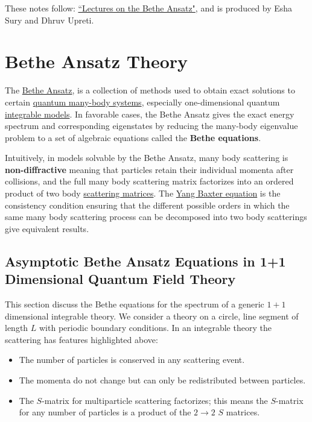 \documentclass{article}
\begin{document}
These notes follow: \href{https://arxiv.org/pdf/1606.02950}{``Lectures on the Bethe Ansatz"}, and is produced by Esha Sury and Dhruv Upreti.

\section{Bethe Ansatz Theory}

The \href{https://en.wikipedia.org/wiki/Bethe_ansatz}{Bethe Ansatz}, is a collection of methods used to obtain exact solutions to certain \href{https://en.wikipedia.org/wiki/Many-body_problem}{quantum many-body systems}, especially one-dimensional quantum \href{https://en.wikipedia.org/wiki/Integrable_system}{integrable models}. In favorable cases, the Bethe Ansatz gives the exact energy spectrum and corresponding eigenstates by reducing the many-body eigenvalue problem to a set of algebraic equations called the \textbf{Bethe equations}. 

Intuitively, in models solvable by the Bethe Ansatz, many body scattering is \textbf{non-diffractive} meaning that particles retain their individual momenta after collisions, and the full many body scattering matrix factorizes into an ordered product of two body \href{https://en.wikipedia.org/wiki/S-matrix}{scattering matrices}. The \href{https://en.wikipedia.org/wiki/Yang%E2%80%93Baxter_equation}{Yang Baxter equation} is the consistency condition ensuring that the different possible orders in which the same many body scattering process can be decomposed into two body scatterings give equivalent results.

\subsection{Asymptotic Bethe Ansatz Equations in 1+1 Dimensional Quantum Field Theory}

This section discuss the Bethe equations for the spectrum of a generic $1+1$ dimensional integrable theory. We consider a theory on a circle, line segment of length $L$ with periodic boundary conditions. In an integrable theory the scattering has features highlighted above: 

\begin{itemize}
    \item The number of particles is conserved in any scattering event.
    \item The momenta do not change but can only be redistributed between particles.
    \item The $S$-matrix for multiparticle scattering factorizes; this means the $S$-matrix for any number of particles is a product of the $2\to 2$ $S$ matrices.
\end{itemize}
\end{document}
